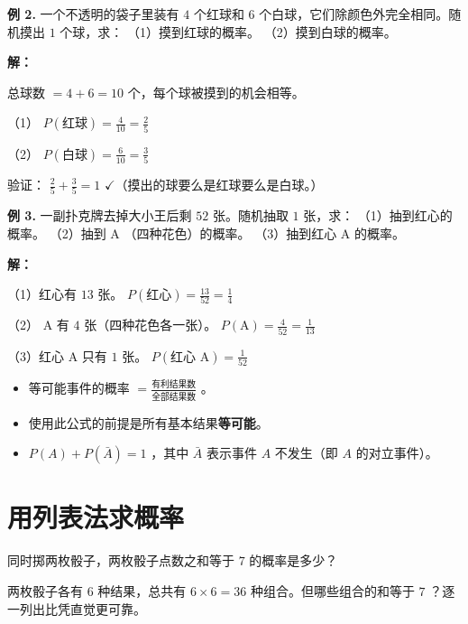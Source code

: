 \begin{workedexamples}


\textbf{例 2.} 一个不透明的袋子里装有 $4$ 个红球和 $6$ 个白球，它们除颜色外完全相同。随机摸出 $1$ 个球，求：
（1）摸到红球的概率。
（2）摸到白球的概率。

\textbf{解：}

总球数 $= 4 + 6 = 10$ 个，每个球被摸到的机会相等。

（1） $P(\text{红球}) = \frac{4}{10} = \frac{2}{5}$

（2） $P(\text{白球}) = \frac{6}{10} = \frac{3}{5}$

验证： $\frac{2}{5} + \frac{3}{5} = 1$ $\checkmark$（摸出的球要么是红球要么是白球。）

\textbf{例 3.} 一副扑克牌去掉大小王后剩 $52$ 张。随机抽取 $1$ 张，求：
（1）抽到红心的概率。
（2）抽到 $\text{A}$ （四种花色）的概率。
（3）抽到红心 $\text{A}$ 的概率。

\textbf{解：}

（1）红心有 $13$ 张。 $P(\text{红心}) = \frac{13}{52} = \frac{1}{4}$

（2） $\text{A}$ 有 $4$ 张（四种花色各一张）。 $P(\text{A}) = \frac{4}{52} = \frac{1}{13}$

（3）红心 $\text{A}$ 只有 $1$ 张。 $P(\text{红心 A}) = \frac{1}{52}$

\end{workedexamples}

\begin{keytakeaway}


\begin{itemize}
  \item 等可能事件的概率 $= \frac{\text{有利结果数}}{\text{全部结果数}}$ 。
  \item 使用此公式的前提是所有基本结果\textbf{等可能}。
  \item $P(A) + P(\bar{A}) = 1$ ，其中 $\bar{A}$ 表示事件 $A$ 不发生（即 $A$ 的对立事件）。
\end{itemize}


\end{keytakeaway}



\section*{用列表法求概率}


\begin{explore}


同时掷两枚骰子，两枚骰子点数之和等于 $7$ 的概率是多少？

两枚骰子各有 $6$ 种结果，总共有 $6 \times 6 = 36$ 种组合。但哪些组合的和等于 $7$ ？逐一列出比凭直觉更可靠。

\end{explore}


